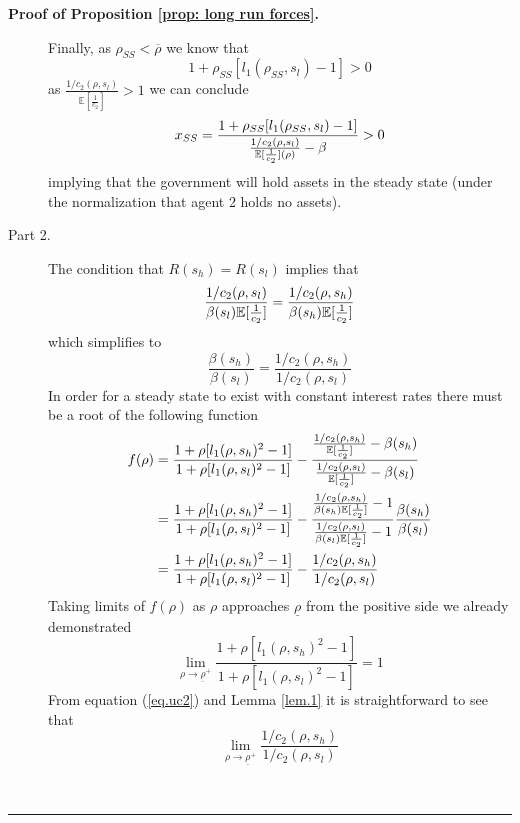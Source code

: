 \documentclass[thmsb,11pt]{article}
\newenvironment{proof}[1][Proof]{\noindent \textbf{#1.} }{\  \rule{0.5em}{0.5em}}
\begin{document}
\begin{appendix}
\begin{proof}[Proof of Proposition \ref{prop: long run forces}]
\begin{description}
Finally, as $\rho_{SS} < \overline \rho$ we know that
\begin{equation*}
1+\rho_{SS}[l_1(\rho_{SS},s_l)-1] >0
\end{equation*}%
as $\frac{1/c_2(\rho,s_l)}{\mathbb{E}[\frac1{c_2}]} >1$ we can
conclude
\begin{equation*}
x_{SS} = \frac{1+\rho_{SS}[l_1(\rho_{SS},s_l)-1]}{\frac{1/c_2(\rho,s_l)}{%
\mathbb{E}[\frac1{c_2}](\rho)}-\beta} >0
\end{equation*}%
implying that the government will hold assets in the steady state (under the
normalization that agent 2 holds no assets).

\item[Part 2.] The condition that $R(s_h) = R(s_l)$ implies that
\begin{equation*}
\frac{1/c_2(\rho,s_l)}{\beta(s_l)\mathbb{E}[\frac1{c_2}]} = \frac{%
1/c_2(\rho,s_h)}{\beta(s_h)\mathbb{E}[\frac1{c_2}]}
\end{equation*}%
which simplifies to
\begin{equation}
\frac{\beta(s_h)}{\beta(s_l)} = \frac{1/c_2(\rho,s_h)}{1/c_2(\rho,s_l)}
\end{equation}
In order for a steady state to exist with constant interest rates there must
be a root of the following function
\begin{align*}
f(\rho) &= \frac{1+\rho[l_1(\rho,s_h)^2-1]}{1+\rho[l_1(\rho,s_l)^2-1]}-\frac{%
\frac{1/c_2(\rho,s_h)}{\mathbb{E}[\frac1{c_2}]}-\beta(s_h) }{\frac{%
1/c_2(\rho,s_l)}{\mathbb{E}[\frac1{c_2}]}-\beta(s_l)} \\
&= \frac{1+\rho[l_1(\rho,s_h)^2-1]}{1+\rho[l_1(\rho,s_l)^2-1]}-\frac{\frac{%
1/c_2(\rho,s_h)}{\beta(s_h)\mathbb{E}[\frac1{c_2}]}-1 }{\frac{%
1/c_2(\rho,s_l)}{\beta(s_l)\mathbb{E}[\frac1{c_2}]}-1}\frac{\beta(s_h)%
}{\beta(s_l)} \\
& = \frac{1+\rho[l_1(\rho,s_h)^2-1]}{1+\rho[l_1(\rho,s_l)^2-1]}-\frac{%
1/c_2(\rho,s_h)}{1/c_2(\rho,s_l)}
\end{align*}
Taking limits of $f(\rho)$ as $\rho$ approaches $\underline\rho$ from the
positive side we already demonstrated
\begin{equation*}
\lim_{\rho\rightarrow\underline\rho^+}\frac{1+\rho[l_1(\rho,s_h)^2-1]}{1+\rho%
[l_1(\rho,s_l)^2-1]} = 1
\end{equation*}
From equation (\ref{eq.uc2}) and Lemma \ref{lem.1} it is straightforward to
see that
\begin{equation*}
\lim_{\rho\rightarrow\underline\rho^+}\frac{1/c_2(\rho,s_h)}{1/c_2(\rho,s_l)}

\end{equation*}
\end{description}
\end{proof}
\end{appendix}
\end{document}

